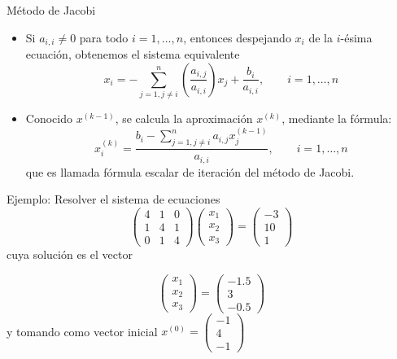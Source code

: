 \documentclass[10pt]{beamer}
\begin{document}
    \begin{frame}{M\'etodo de Jacobi}
    \begin{itemize}
      \item<1->Si $a_{i,i}\neq 0$ para todo $i=1,\ldots,n$, entonces despejando $x_i$ de la $i$-\'esima ecuaci\'on, obtenemos el sistema equivalente       
       $$
       x_i = -\sum_{j=1,j\neq i}^n\left(\frac{a_{i,j}}{a_{i,i}}\right)x_j + \frac{b_i}{a_{i,i}}, \qquad i=1,\ldots,n
       $$       
       \item<2->Conocido $x^{(k-1)}$, se calcula la aproximaci\'on $x^{(k)}$, mediante la f\'ormula:       
       $$
       x_i^{(k)} = \displaystyle\frac{b_i-\displaystyle\sum_{j=1,j\neq i}^na_{i,j}x_j^{(k-1)}}{a_{i,i}}, \qquad i=1,\ldots,n
       $$       
       que es llamada f\'ormula escalar de iteraci\'on del m\'etodo de Jacobi.
      \end{itemize}
      \end{frame}     
      \begin{frame}{Ejemplo:}      
      Resolver el sistema de ecuaciones
      $$
\left(\begin{array}{ccc}
       4 & 1 & 0\\
       1 & 4 & 1\\
       0 & 1 & 4
      \end{array}\right)\left(\begin{array}{c}
      x_1\\
      x_2\\
      x_3
      \end{array}\right)=\left(\begin{array}{c}
      -3\\
      10\\
      1
      \end{array}\right)
      $$
      cuya soluci\'on es el vector

$$
\left(\begin{array}{c}
      x_1\\
      x_2\\
      x_3
      \end{array}\right)=\left(\begin{array}{c}
      -1.5\\
      3\\
      -0.5
      \end{array}\right)
$$
      y tomando como vector inicial $x^{(0)} = \left(\begin{array}{c}
      -1\\
      4\\
      -1
      \end{array}\right)$
      \end{frame}
\end{document}
